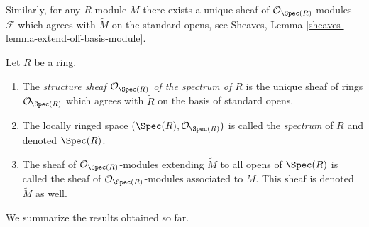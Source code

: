 \medskip\noindent
Similarly, for any $R$-module $M$ there exists
a unique sheaf of $\mathcal{O}_{\Spec(R)}$-modules
$\mathcal{F}$ which agrees with $\widetilde M$ on the
standard opens, see
Sheaves, Lemma \ref{sheaves-lemma-extend-off-basis-module}.

\begin{definition}
\label{definition-structure-sheaf}
Let $R$ be a ring.
\begin{enumerate}
\item The {\it structure sheaf $\mathcal{O}_{\Spec(R)}$ of the
spectrum of $R$} is the unique sheaf of rings $\mathcal{O}_{\Spec(R)}$
which agrees with $\widetilde R$ on the basis of standard opens.
\item The locally ringed space
$(\Spec(R), \mathcal{O}_{\Spec(R)})$ is called
the {\it spectrum} of $R$ and denoted $\Spec(R)$.
\item The sheaf of $\mathcal{O}_{\Spec(R)}$-modules
extending $\widetilde M$ to all opens of $\Spec(R)$
is called the sheaf of $\mathcal{O}_{\Spec(R)}$-modules
associated to $M$. This sheaf is denoted $\widetilde M$ as
well.
\end{enumerate}
\end{definition}

\noindent
We summarize the results obtained so far.

